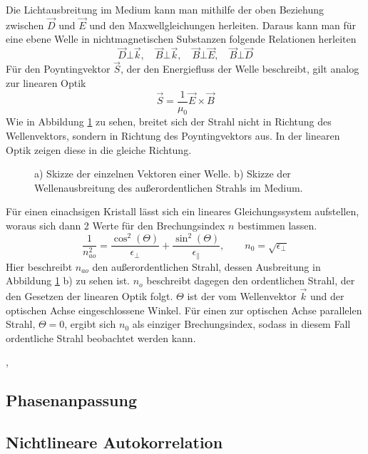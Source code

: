 Die Lichtausbreitung im Medium kann man mithilfe der oben Beziehung zwischen 
$\vec{D}$ und $\vec{E}$ und den Maxwellgleichungen herleiten. Daraus kann man 
für eine ebene Welle in nichtmagnetischen Substanzen folgende Relationen herleiten
\[
    \vec{D} \bot \vec{k}, \quad \vec{B} \bot \vec{k}, \quad
    \vec{B} \bot \vec{E}, \quad \vec{B} \bot \vec{D}
\]
Für den Poyntingvektor $\vec{S}$, der den Energiefluss der Welle beschreibt, 
gilt analog zur linearen Optik
\[
    \vec{S} = \frac{1}{\mu_0} \vec{E} \times \vec{B}
\]
Wie in Abbildung \ref{abb:doppel} zu sehen, breitet sich der Strahl nicht in
Richtung des Wellenvektors, sondern in Richtung des Poyntingvektors aus. In der
linearen Optik zeigen diese in die gleiche Richtung.
\begin{figure}[h]
  \centering
  
    \caption{a) Skizze der einzelnen Vektoren einer Welle. b) Skizze der 
             Wellenausbreitung des außerordentlichen Strahls im Medium.}
  \label{abb:doppel}
\end{figure}
Für einen einachsigen Kristall lässt sich ein lineares Gleichungssystem 
aufstellen, woraus sich dann 2 Werte für den Brechungsindex $n$ bestimmen lassen.
\[
    \frac{1}{n_{ao}^2} = \frac{\cos^2(\Theta)}{\epsilon_{\bot}} +
                         \frac{\sin^2(\Theta)}{\epsilon_{\parallel}},
    \qquad n_0 = \sqrt{\epsilon_{\bot}}
\]
Hier beschreibt $n_{ao}$ den außerordentlichen Strahl, dessen Ausbreitung in
Abbildung \ref{abb:doppel} b) zu sehen ist. $n_o$ beschreibt dagegen den 
ordentlichen Strahl, der den Gesetzen der linearen Optik folgt. 
$\Theta$ ist der vom Wellenvektor $\vec{k}$ und der optischen Achse 
eingeschlossene Winkel. Für einen zur optischen Achse parallelen Strahl, 
$\Theta=0$, ergibt sich $n_0$ als einziger Brechungsindex, sodass in diesem Fall
ordentliche Strahl beobachtet werden kann.

\autocite{zinth}, \autocite{hecht}
    \subsection{Phasenanpassung}

    \subsection{Nichtlineare Autokorrelation}

